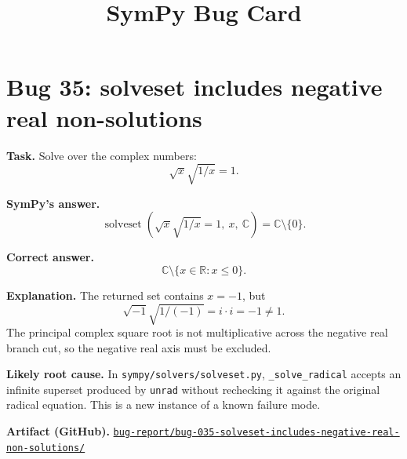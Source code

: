 \documentclass[11pt]{article}
\title{SymPy Bug Card}
\author{}
\date{}
\newcommand{\artifactrepo}{https://github.com/TODO-org/TODO-repo}
\newcommand{\bugbundle}[1]{\href{\artifactrepo/tree/main/bug-report/#1}{\nolinkurl{bug-report/#1/}}}
\begin{document}
\maketitle

\section*{Bug 35: solveset includes negative real non-solutions}

\begin{counterexamplebox}
\textbf{Task.} Solve over the complex numbers:
\[
  \sqrt{x}\sqrt{1/x}=1.
\]

\medskip
\textbf{SymPy's answer.}
\[
  \operatorname{solveset}\!\left(\sqrt{x}\sqrt{1/x}=1,\ x,\ \mathbb{C}\right)
  = \mathbb{C}\setminus\{0\}.
\]

\medskip
\textbf{Correct answer.}
\[
  \mathbb{C}\setminus\{x\in\mathbb{R}:x\le 0\}.
\]

\medskip
\textbf{Explanation.} The returned set contains \(x=-1\), but
\[
  \sqrt{-1}\sqrt{1/(-1)} = i\cdot i = -1 \ne 1.
\]
The principal complex square root is not multiplicative across the negative real
branch cut, so the negative real axis must be excluded.

\medskip
\textbf{Likely root cause.} In \nolinkurl{sympy/solvers/solveset.py},
\texttt{\_solve\_radical} accepts an infinite superset produced by
\texttt{unrad} without rechecking it against the original radical equation. This
is a new instance of a known failure mode.

\medskip
\textbf{Artifact (GitHub).} \bugbundle{bug-035-solveset-includes-negative-real-non-solutions}
\end{counterexamplebox}
\end{document}
